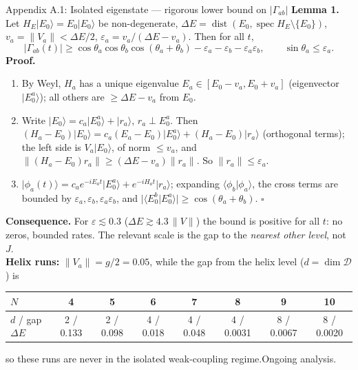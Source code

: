 \documentclass[aspectratio=169,11pt]{beamer}
\newcommand{\ket}[1]{\lvert #1\rangle}
\newcommand{\spec}{\operatorname{spec}}
\newcommand{\ongoing}{{\color{muted}\footnotesize Ongoing analysis.}}
\begin{document}
\begin{frame}[shrink=6]{Appendix A.1: Isolated eigenstate --- rigorous lower bound on $\lvert\Gamma_{ab}\rvert$}
\footnotesize
\textbf{Lemma 1.} Let $H_E\ket{E_0}=E_0\ket{E_0}$ be non-degenerate, $\Delta E=\operatorname{dist}(E_0,\spec H_E\setminus\{E_0\})$, $v_a=\lVert V_a\rVert<\Delta E/2$, $\varepsilon_a=v_a/(\Delta E-v_a)$. Then for all $t$,
\[
\lvert\Gamma_{ab}(t)\rvert\ge\cos\theta_a\cos\theta_b\cos(\theta_a+\theta_b)-\varepsilon_a-\varepsilon_b-\varepsilon_a\varepsilon_b,\qquad \sin\theta_a\le\varepsilon_a .
\]
\textbf{Proof.}
\begin{enumerate}\setlength\itemsep{2pt}
\item By Weyl, $H_a$ has a unique eigenvalue $E_a\in[E_0-v_a,E_0+v_a]$ (eigenvector $\ket{E_0^a}$); all others are $\ge\Delta E-v_a$ from $E_0$.
\item Write $\ket{E_0}=c_a\ket{E_0^a}+\ket{r_a}$, $r_a\perp E_0^a$. Then $(H_a-E_0)\ket{E_0}=c_a(E_a-E_0)\ket{E_0^a}+(H_a-E_0)\ket{r_a}$ (orthogonal terms); the left side is $V_a\ket{E_0}$, of norm $\le v_a$, and $\lVert(H_a-E_0)r_a\rVert\ge(\Delta E-v_a)\lVert r_a\rVert$. So $\lVert r_a\rVert\le\varepsilon_a$.
\item $\ket{\phi_a(t)}=c_ae^{-iE_at}\ket{E_0^a}+e^{-iH_at}\ket{r_a}$; expanding $\langle\phi_b\vert\phi_a\rangle$, the cross terms are bounded by $\varepsilon_a,\varepsilon_b,\varepsilon_a\varepsilon_b$, and $\lvert\langle E_0^b\vert E_0^a\rangle\rvert\ge\cos(\theta_a+\theta_b)$. $\square$
\end{enumerate}
\textbf{Consequence.} For $\varepsilon\lesssim0.3$ ($\Delta E\gtrsim4.3\,\lVert V\rVert$) the bound is positive for all $t$: no zeros, bounded rates. The relevant scale is the gap to the \emph{nearest other level}, not $J$.\\[2pt]
\textbf{Helix runs:} $\lVert V_a\rVert=g/2=0.05$, while the gap from the helix level ($d=\dim\mathcal D$) is
\begin{center}
\begin{tabular}{@{}lccccccc@{}}\toprule
$N$&4&5&6&7&8&9&10\\\midrule
$d$ / gap $\Delta E$&2 / 0.133&2 / 0.098&4 / 0.018&4 / 0.048&4 / 0.0031&8 / 0.0067&8 / 0.0020\\\bottomrule
\end{tabular}
\end{center}
so these runs are never in the isolated weak-coupling regime.\hfill\ongoing
\end{frame}
\end{document}
